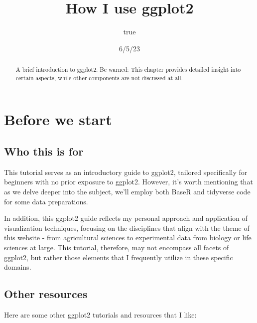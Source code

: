 \documentclass[
  letterpaper,
  DIV=11,
  numbers=noendperiod]{scrartcl}
\title{How I use ggplot2}
\author{true}
\date{6/5/23}
\renewcommand*\contentsname{Table of contents}
\newcommand\contentsname{Table of contents}
\begin{document}
\maketitle
\begin{abstract}
A brief introduction to ggplot2. Be warned: This chapter provides
detailed insight into certain aspects, while other components are not
discussed at all.
\end{abstract}
\ifdefined\Shaded\renewenvironment{Shaded}{\begin{tcolorbox}[sharp corners, borderline west={3pt}{0pt}{shadecolor}, enhanced, breakable, boxrule=0pt, interior hidden, frame hidden]}{\end{tcolorbox}}\fi

\renewcommand*\contentsname{Table of contents}
{
\hypersetup{linkcolor=}
\setcounter{tocdepth}{3}
\tableofcontents
}
\hypertarget{before-we-start}{%
\section{Before we start}\label{before-we-start}}

\hypertarget{who-this-is-for}{%
\subsection{Who this is for}\label{who-this-is-for}}

This tutorial serves as an introductory guide to ggplot2, tailored
specifically for beginners with no prior exposure to ggplot2. However,
it's worth mentioning that as we delve deeper into the subject, we'll
employ both BaseR and tidyverse code for some data preparations.

In addition, this ggplot2 guide reflects my personal approach and
application of visualization techniques, focusing on the disciplines
that align with the theme of this website - from agricultural sciences
to experimental data from biology or life sciences at large. This
tutorial, therefore, may not encompass all facets of ggplot2, but rather
those elements that I frequently utilize in these specific domains.

\hypertarget{other-resources}{%
\subsection{Other resources}\label{other-resources}}

Here are some other ggplot2 tutorials and resources that I like:
\end{document}
